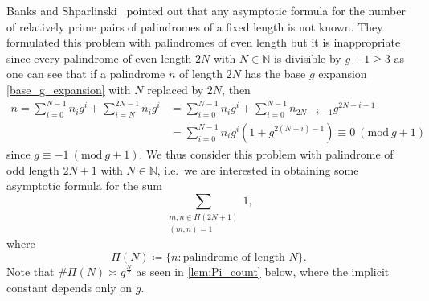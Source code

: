 \documentclass{amsart}
\theoremstyle{plain}
\theoremstyle{definition}
\renewcommand{\mod}[1]{(\mathrm{mod}\ #1)}
\begin{document}
Banks and Shparlinski~\cite[p.~101]{BanksShparlinski:PalindromePhi}
pointed out that any asymptotic formula for the number of relatively prime pairs
of palindromes of a fixed length is not known.
They formulated this problem with palindromes of even length
but it is inappropriate since every palindrome of even length $2N$ with $N\in\mathbb{N}$
is divisible by $g+1\ge3$ as one can see that if a palindrome $n$ of length $2N$
has the base $g$ expansion \cref{base_g_expansion} with $N$ replaced by $2N$, then
\begin{align}
n
=
\sum_{i=0}^{N-1}
n_{i}g^{i}
+
\sum_{i=N}^{2N-1}
n_{i}g^{i}
&=
\sum_{i=0}^{N-1}
n_{i}g^{i}
+
\sum_{i=0}^{N-1}
n_{2N-i-1}g^{2N-i-1}\\
&=
\sum_{i=0}^{N-1}
n_{i}g^{i}(1+g^{2(N-i)-1})
\equiv0\ \mod{g+1}
\end{align}
since $g\equiv-1\ \mod{g+1}$.
We thus consider this problem with palindrome of odd length $2N+1$ with $N\in\mathbb{N}$,
i.e.\ we are interested in obtaining some asymptotic formula for the sum
\begin{equation}
\label{main_sum}
\sum_{\substack{
m,n\in\Pi(2N+1)\\
(m,n)=1
}}
1,
\end{equation}
where
\begin{equation}
\label{def:Pi_N}
\Pi(N)
\coloneqq
\{
n:\text{palindrome of length $N$}
\}.
\end{equation}
Note that $\#\Pi(N)\asymp g^{\frac{N}{2}}$ as seen in \cref{lem:Pi_count} below,
where the implicit constant depends only on $g$.
\end{document}
